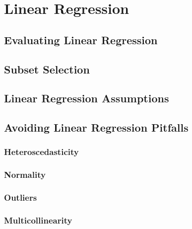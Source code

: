 \documentclass[
]{book}
\begin{document}
\hypertarget{linear-regression}{%
\section{Linear Regression}\label{linear-regression}}

\hypertarget{evaluating-linear-regression}{%
\subsection{Evaluating Linear Regression}\label{evaluating-linear-regression}}

\hypertarget{subset-selection}{%
\subsection{Subset Selection}\label{subset-selection}}

\hypertarget{linear-regression-assumptions}{%
\subsection{Linear Regression Assumptions}\label{linear-regression-assumptions}}

\hypertarget{avoiding-linear-regression-pitfalls}{%
\subsection{Avoiding Linear Regression Pitfalls}\label{avoiding-linear-regression-pitfalls}}

\hypertarget{heteroscedasticity}{%
\subsubsection{Heteroscedasticity}\label{heteroscedasticity}}

\hypertarget{normality}{%
\subsubsection{Normality}\label{normality}}

\hypertarget{outliers}{%
\subsubsection{Outliers}\label{outliers}}

\hypertarget{multicollinearity}{%
\subsubsection{Multicollinearity}\label{multicollinearity}}
\end{document}
